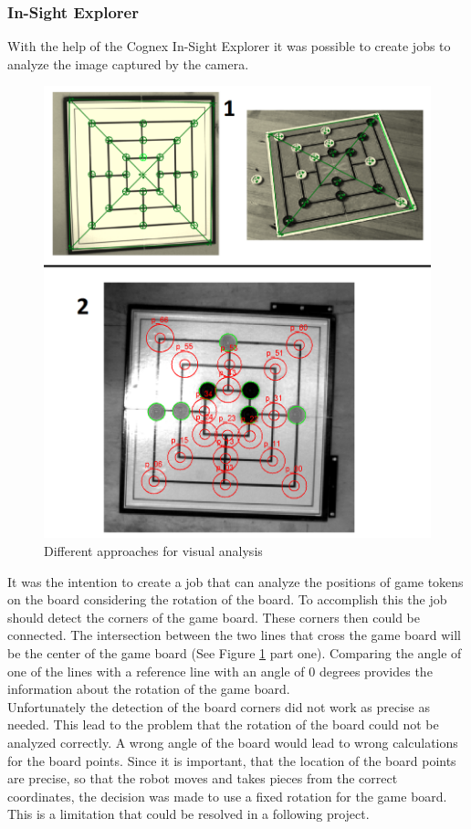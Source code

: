 \documentclass[a4paper]{spie}  %
\begin{document}
\begin{large}
\subsubsection{In-Sight Explorer}
With the help of the Cognex In-Sight Explorer it was possible to create jobs to analyze the image captured by the camera.\\
\begin{figure}[h]
\includegraphics[width=15cm]{images/camera_00.png}
\centering
\caption{Different approaches for visual analysis}
\label{camera_00}
\end{figure}
It was the intention to create a job that can analyze the positions of game tokens on the board considering the rotation of the board. To accomplish this the job should detect the corners of the game board. These corners then could be connected. The intersection between the two lines that cross the game board will be the center of the game board (See Figure \ref{camera_00} part one). Comparing the angle of one of the lines with a reference line with an angle of 0 degrees provides the information about the rotation of the game board.\\ Unfortunately the detection of the board corners did not work as precise as needed. This lead to the problem that the rotation of the board could not be analyzed correctly. A wrong angle of the board would lead to wrong calculations for the board points. Since it is important, that the location of the board points are precise, so that the robot moves and takes pieces from the correct coordinates, the decision was made to use a fixed rotation for the game board. This is a limitation that could be resolved in a following project.\\

\end{large}
\end{document}
